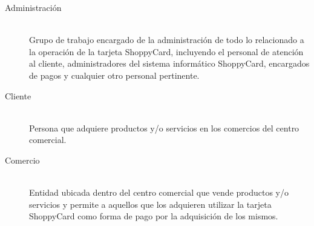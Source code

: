 \begin{description}

\item[Administración] \hfill \\
Grupo de trabajo encargado de la administración de todo lo relacionado a la
operación de la tarjeta ShoppyCard, incluyendo el personal de atención al
cliente, administradores del sistema informático ShoppyCard, encargados de pagos
y cualquier otro personal pertinente.

\item[Cliente] \hfill \\
Persona que adquiere productos y/o servicios en los comercios del centro
comercial.

\item[Comercio] \hfill \\
Entidad ubicada dentro del centro comercial que vende productos y/o servicios y
permite a aquellos que los adquieren utilizar la tarjeta ShoppyCard como forma
de pago por la adquisición de los mismos.

\end{description}
